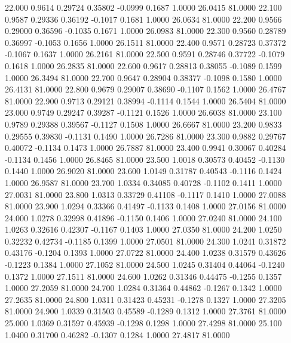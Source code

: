   22.000   0.9614   0.29724   0.35802  -0.0999   0.1687   1.0000  26.0415  81.0000
  22.100   0.9587   0.29336   0.36192  -0.1017   0.1681   1.0000  26.0634  81.0000
  22.200   0.9566   0.29000   0.36596  -0.1035   0.1671   1.0000  26.0983  81.0000
  22.300   0.9560   0.28789   0.36997  -0.1053   0.1656   1.0000  26.1511  81.0000
  22.400   0.9571   0.28723   0.37372  -0.1067   0.1637   1.0000  26.2161  81.0000
  22.500   0.9591   0.28746   0.37722  -0.1079   0.1618   1.0000  26.2835  81.0000
  22.600   0.9617   0.28813   0.38055  -0.1089   0.1599   1.0000  26.3494  81.0000
  22.700   0.9647   0.28904   0.38377  -0.1098   0.1580   1.0000  26.4131  81.0000
  22.800   0.9679   0.29007   0.38690  -0.1107   0.1562   1.0000  26.4767  81.0000
  22.900   0.9713   0.29121   0.38994  -0.1114   0.1544   1.0000  26.5404  81.0000
  23.000   0.9749   0.29247   0.39287  -0.1121   0.1526   1.0000  26.6038  81.0000
  23.100   0.9789   0.29388   0.39567  -0.1127   0.1508   1.0000  26.6667  81.0000
  23.200   0.9833   0.29555   0.39830  -0.1131   0.1490   1.0000  26.7286  81.0000
  23.300   0.9882   0.29767   0.40072  -0.1134   0.1473   1.0000  26.7887  81.0000
  23.400   0.9941   0.30067   0.40284  -0.1134   0.1456   1.0000  26.8465  81.0000
  23.500   1.0018   0.30573   0.40452  -0.1130   0.1440   1.0000  26.9020  81.0000
  23.600   1.0149   0.31787   0.40543  -0.1116   0.1424   1.0000  26.9587  81.0000
  23.700   1.0334   0.34085   0.40728  -0.1102   0.1411   1.0000  27.0031  81.0000
  23.800   1.0313   0.33729   0.41108  -0.1117   0.1410   1.0000  27.0088  81.0000
  23.900   1.0294   0.33366   0.41497  -0.1133   0.1408   1.0000  27.0156  81.0000
  24.000   1.0278   0.32998   0.41896  -0.1150   0.1406   1.0000  27.0240  81.0000
  24.100   1.0263   0.32616   0.42307  -0.1167   0.1403   1.0000  27.0350  81.0000
  24.200   1.0250   0.32232   0.42734  -0.1185   0.1399   1.0000  27.0501  81.0000
  24.300   1.0241   0.31872   0.43176  -0.1204   0.1393   1.0000  27.0722  81.0000
  24.400   1.0238   0.31579   0.43626  -0.1223   0.1384   1.0000  27.1052  81.0000
  24.500   1.0245   0.31404   0.44064  -0.1240   0.1372   1.0000  27.1511  81.0000
  24.600   1.0262   0.31346   0.44475  -0.1255   0.1357   1.0000  27.2059  81.0000
  24.700   1.0284   0.31364   0.44862  -0.1267   0.1342   1.0000  27.2635  81.0000
  24.800   1.0311   0.31423   0.45231  -0.1278   0.1327   1.0000  27.3205  81.0000
  24.900   1.0339   0.31503   0.45589  -0.1289   0.1312   1.0000  27.3761  81.0000
  25.000   1.0369   0.31597   0.45939  -0.1298   0.1298   1.0000  27.4298  81.0000
  25.100   1.0400   0.31700   0.46282  -0.1307   0.1284   1.0000  27.4817  81.0000
